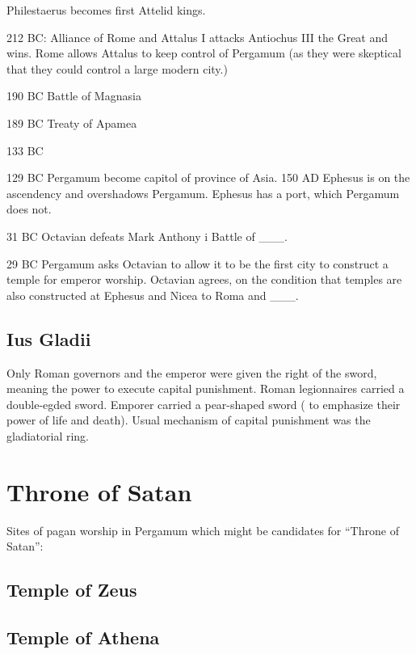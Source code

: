 \documentclass[
]{book}
\begin{document}
Philestaerus becomes first Attelid kings.

212 BC: Alliance of Rome and Attalus I attacks Antiochus III the Great and wins. Rome allows Attalus to keep control of Pergamum (as they were skeptical that they could control a large modern city.)

190 BC Battle of Magnasia

189 BC Treaty of Apamea

133 BC

129 BC Pergamum become capitol of province of Asia. 150 AD Ephesus is on the ascendency and overshadows Pergamum. Ephesus has a port, which Pergamum does not.

31 BC Octavian defeats Mark Anthony i Battle of \_\_\_.

29 BC Pergamum asks Octavian to allow it to be the first city to construct a temple for emperor worship. Octavian agrees, on the condition that temples are also constructed at Ephesus and Nicea to Roma and \_\_\_.

\hypertarget{ius-gladii}{%
\subsection{Ius Gladii}\label{ius-gladii}}

Only Roman governors and the emperor were given the right of the sword, meaning the power to execute capital punishment. Roman legionnaires carried a double-egded sword. Emporer carried a pear-shaped sword ( to emphasize their power of life and death). Usual mechanism of capital punishment was the gladiatorial ring.

\hypertarget{throne-of-satan}{%
\section{Throne of Satan}\label{throne-of-satan}}

Sites of pagan worship in Pergamum which might be candidates for ``Throne of Satan'':

\hypertarget{temple-of-zeus}{%
\subsection{Temple of Zeus}\label{temple-of-zeus}}

\hypertarget{temple-of-athena}{%
\subsection{Temple of Athena}\label{temple-of-athena}}
\end{document}
